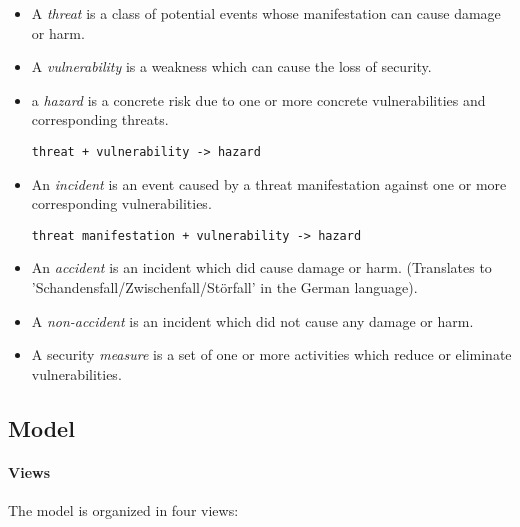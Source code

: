 

\begin{itemize}

\item A \emph{threat} is a class of potential events whose manifestation can
cause damage or harm.

\item A \emph{vulnerability} is a weakness which can cause the loss of security.

\item a \emph{hazard} is a concrete risk due to one or more concrete vulnerabilities and corresponding threats.

\texttt{threat + vulnerability -\textgreater{} hazard}

\item An \emph{incident} is an event caused by a threat manifestation against one or more
corresponding vulnerabilities.

\texttt{threat manifestation + vulnerability -\textgreater{} hazard}

\item An \emph{accident} is an incident which did cause damage or harm. (Translates to 'Schandensfall/Zwischenfall/Störfall' in the German language).

\item A \emph {non-accident} is an incident which did not cause any damage or harm.

\item A security \emph{measure} is a set of one or more activities which reduce or eliminate
vulnerabilities.

\end{itemize}


\subsection{Model}



\paragraph{Views}

The model is organized in four views:

